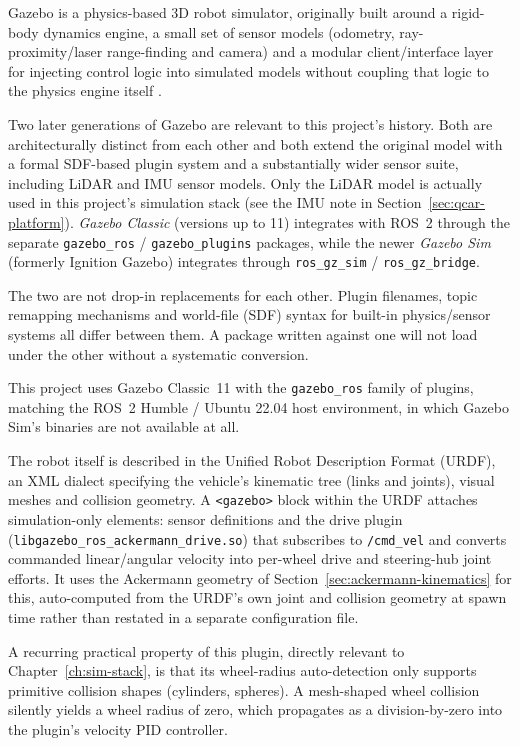 Gazebo is a physics-based 3D robot simulator, originally built around
a rigid-body dynamics engine, a small set of sensor models (odometry,
ray-proximity/laser range-finding and camera) and a modular
client/interface layer for injecting control logic into simulated
models without coupling that logic to the physics engine itself
\cite{koenig2004gazebo}.

Two later generations of Gazebo are relevant to this project's
history. Both are architecturally distinct from each other and both
extend the original model with a formal SDF-based plugin system and a
substantially wider sensor suite, including LiDAR and IMU sensor
models. Only the LiDAR model is actually used in this project's
simulation stack (see the IMU note in
Section~\ref{sec:qcar-platform}). \emph{Gazebo Classic} (versions up
to 11) integrates with ROS~2 through the separate
\texttt{gazebo\_ros} / \texttt{gazebo\_plugins} packages, while the
newer \emph{Gazebo Sim} (formerly Ignition Gazebo) integrates through
\texttt{ros\_gz\_sim} / \texttt{ros\_gz\_bridge}.

The two are not drop-in replacements for each other. Plugin
filenames, topic remapping mechanisms and world-file (SDF) syntax
for built-in physics/sensor systems all differ between them. A
package written against one will not load under the other without a
systematic conversion.

This project uses Gazebo Classic~11 with the \texttt{gazebo\_ros}
family of plugins, matching the ROS~2 Humble / Ubuntu 22.04 host
environment, in which Gazebo Sim's binaries are not available at
all.

The robot itself is described in the Unified Robot Description
Format (URDF), an XML dialect specifying the vehicle's kinematic
tree (links and joints), visual meshes and collision geometry. A
\texttt{<gazebo>} block within the URDF attaches simulation-only
elements: sensor definitions and the drive plugin
(\texttt{libgazebo\_ros\_ackermann\_drive.so}) that subscribes to
\texttt{/cmd\_vel} and converts commanded linear/angular velocity
into per-wheel drive and steering-hub joint efforts. It uses the
Ackermann geometry of Section~\ref{sec:ackermann-kinematics} for
this, auto-computed from the URDF's own joint and collision geometry
at spawn time rather than restated in a separate configuration file.

A recurring practical property of this plugin, directly relevant to
Chapter~\ref{ch:sim-stack}, is that its wheel-radius auto-detection
only supports primitive collision shapes (cylinders, spheres). A
mesh-shaped wheel collision silently yields a wheel radius of zero,
which propagates as a division-by-zero into the plugin's velocity
PID controller.

